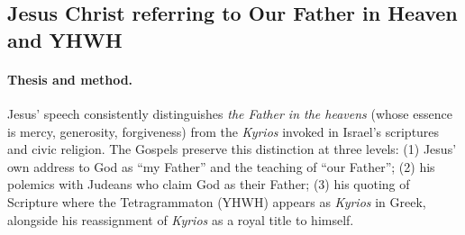 \subsection{Jesus Christ referring to Our Father in Heaven and YHWH}\label{subsec:jesus-christ-referring-to-our-father-in-heaven-and-yhwh}

\paragraph{Thesis and method.}
Jesus’ speech consistently distinguishes \emph{the Father in the heavens} (whose essence is mercy, generosity, forgiveness) from the \emph{Kyrios} invoked in Israel’s scriptures and civic religion. The Gospels preserve this distinction at three levels: (1) Jesus’ own address to God as “my Father” and the teaching of “our Father”; (2) his polemics with Judeans who claim God as their Father; (3) his quoting of Scripture where the Tetragrammaton (YHWH) appears as \emph{Kyrios} in Greek, alongside his reassignment of \emph{Kyrios} as a royal title to himself.


